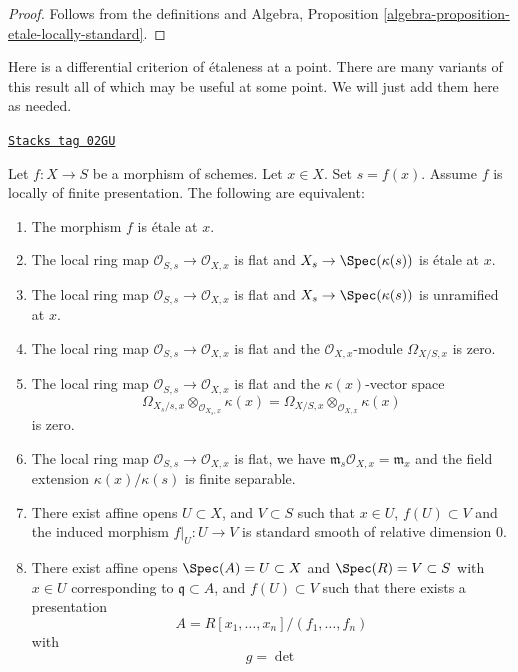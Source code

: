 \begin{proof}
Follows from the definitions and
Algebra, Proposition \ref{algebra-proposition-etale-locally-standard}.
\end{proof}

Here is a differential criterion of \'etaleness at a point.
There are many variants of this result
all of which may be useful at some point. We will just add them
here as needed.

\begin{lemma}
\label{morphisms-lemma-etale-at-point}
\href{https://stacks.math.columbia.edu/tag/02GU}{\texttt{Stacks tag 02GU}}

Let $f : X \to S$ be a morphism of schemes.
Let $x \in X$.
Set $s = f(x)$.
Assume $f$ is locally of finite presentation.
The following are equivalent:
\begin{enumerate}
\item The morphism $f$ is \'etale at $x$.
\item The local ring map $\mathcal{O}_{S, s} \to \mathcal{O}_{X, x}$
is flat and $X_s \to \Spec(\kappa(s))$ is \'etale at $x$.
\item The local ring map $\mathcal{O}_{S, s} \to \mathcal{O}_{X, x}$
is flat and $X_s \to \Spec(\kappa(s))$ is unramified at $x$.
\item The local ring map $\mathcal{O}_{S, s} \to \mathcal{O}_{X, x}$
is flat and the $\mathcal{O}_{X, x}$-module $\Omega_{X/S, x}$
is zero.
\item The local ring map $\mathcal{O}_{S, s} \to \mathcal{O}_{X, x}$
is flat and the $\kappa(x)$-vector space
$$
\Omega_{X_s/s, x} \otimes_{\mathcal{O}_{X_s, x}} \kappa(x) =
\Omega_{X/S, x} \otimes_{\mathcal{O}_{X, x}} \kappa(x)
$$
is zero.
\item The local ring map $\mathcal{O}_{S, s} \to \mathcal{O}_{X, x}$
is flat, we have $\mathfrak m_s\mathcal{O}_{X, x} = \mathfrak m_x$ and
the field extension $\kappa(x)/\kappa(s)$ is finite
separable.
\item There exist affine opens $U \subset X$,
and $V \subset S$ such that $x \in U$, $f(U) \subset V$ and the
induced morphism $f|_U : U \to V$ is standard smooth
of relative dimension $0$.
\item There exist affine opens $\Spec(A) = U \subset X$
and $\Spec(R) = V \subset S$ with $x \in U$ corresponding
to $\mathfrak q \subset A$, and $f(U) \subset V$
such that there exists a presentation
$$
A = R[x_1, \ldots, x_n]/(f_1, \ldots, f_n)
$$
with
$$
g =
\det
$$
\end{enumerate}
\end{lemma}
